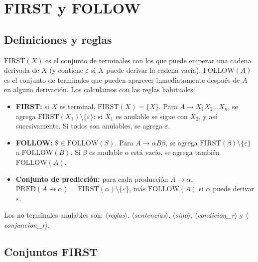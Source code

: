 \documentclass[10pt,a4paper]{article}
\newcommand{\nt}[1]{\ensuremath{\langle}\textit{#1}\ensuremath{\rangle}}   %
\begin{document}
\section{FIRST y FOLLOW}
\label{sec:firstfollow}

\subsection{Definiciones y reglas}

$\text{FIRST}(X)$ es el conjunto de terminales con los que puede empezar una cadena derivada de $X$ (y contiene
$\varepsilon$ si $X$ puede derivar la cadena vacía). $\text{FOLLOW}(A)$ es el conjunto de terminales que pueden
aparecer inmediatamente después de $A$ en alguna derivación. Los calculamos con las reglas habituales:

\begin{itemize}[nosep]
\item \textbf{FIRST:} si $X$ es terminal, $\text{FIRST}(X)=\{X\}$. Para $A \rightarrow X_1 X_2 \ldots X_n$, se agrega
$\text{FIRST}(X_1)\setminus\{\varepsilon\}$; si $X_1$ es anulable se sigue con $X_2$, y así sucesivamente. Si todos
son anulables, se agrega $\varepsilon$.
\item \textbf{FOLLOW:} $\$ \in \text{FOLLOW}(S)$. Para $A \rightarrow \alpha B \beta$, se agrega
$\text{FIRST}(\beta)\setminus\{\varepsilon\}$ a $\text{FOLLOW}(B)$. Si $\beta$ es anulable o está vacío, se agrega
también $\text{FOLLOW}(A)$.
\item \textbf{Conjunto de predicción:} para cada producción $A \rightarrow \alpha$,
$\text{PRED}(A \rightarrow \alpha) = \text{FIRST}(\alpha)\setminus\{\varepsilon\}$, más $\text{FOLLOW}(A)$ si $\alpha$ puede derivar $\varepsilon$.
\end{itemize}

Los no terminales anulables son: \nt{reglas}, \nt{sentencias}, \nt{sino}, \nt{condicion\_r} y \nt{conjuncion\_r}.

\subsection{Conjuntos FIRST}
\end{document}
